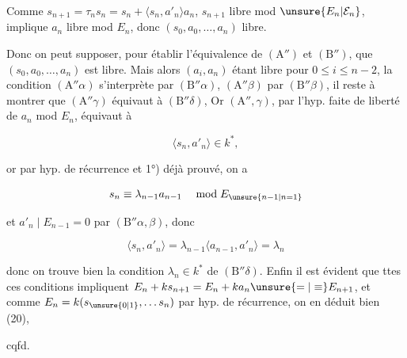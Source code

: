 
Comme $s_{n+1}=\tau_n s_n=s_n+\langle s_n,a'_n\rangle a_n$,  $s_{n+1}$ libre mod $\unsure{E_n|\mathcal E_n}$, implique $a_n$ libre mod $E_n$, donc $(s_0,a_0,\ldots,a_n)$ libre.


Donc on peut supposer, pour établir l'équivalence de $(\mathrm A'')$ et $(\mathrm B'')$, que $(s_0,a_0,\ldots,a_n)$ est libre. Mais alors  $(a_i,a_n)$ étant libre pour $0\leq i\leq n-2$, la condition  $(\mathrm A''\alpha)$ s'interprète par $(\mathrm B''\alpha)$, $(\mathrm A''\beta)$ par $(\mathrm B''\beta)$, il reste à montrer que $(\mathrm A''\gamma)$ équivaut à $(\mathrm B''\delta)$,  Or $(\mathrm A'',\gamma)$, par l'hyp. faite de liberté de $a_n$ mod $E_n$, équivaut à

\[\langle s_n,a'_n\rangle\in k^*,\]

or par hyp. de récurrence et 1°) déjà prouvé, on a

\[s_n\equiv\lambda_{n-1}a_{n-1}\quad\bmod E_{\unsure{n-1|n=1}}\]

et $a'_n\mid E_{n-1}=0$ par $(\mathrm B''\alpha,\beta)$, donc

\[\langle s_n,a'_n\rangle=\lambda_{n-1}\langle a_{n-1},a'_n\rangle=\lambda_n\]

donc on trouve bien la condition $\lambda_n\in k^*$ de $(\mathrm B''\delta)$. Enfin il est évident que ttes ces conditions impliquent $E_n+ks_{n+1}=E_n+ka_n\unsure{=|\equiv}E_{n+1}$, et comme $E_n=k(s_{\unsure{0|1}},\ldots s_n)$ par hyp. de récurrence, on en déduit bien (20),

cqfd.

